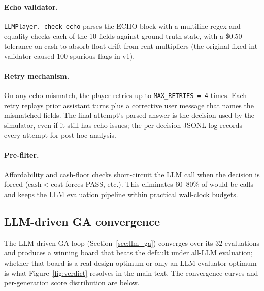 \documentclass[10pt]{article}
\begin{document}
\paragraph{Echo validator.} \texttt{LLMPlayer.\_check\_echo} parses
the ECHO block with a multiline regex and equality-checks each of
the 10 fields against ground-truth state, with a \$0.50 tolerance
on cash to absorb float drift from rent multipliers (the original
fixed-int validator caused $100$ spurious flags in v1).

\paragraph{Retry mechanism.} On any echo mismatch, the player
retries up to \texttt{MAX\_RETRIES = 4} times. Each retry replays
prior assistant turns plus a corrective user message that names
the mismatched fields. The final attempt's parsed answer is the
decision used by the simulator, even if it still has echo issues;
the per-decision JSONL log records every attempt for post-hoc
analysis.

\paragraph{Pre-filter.} Affordability and cash-floor checks
short-circuit the LLM call when the decision is forced
($\mathrm{cash} < \mathrm{cost}$ forces PASS, etc.). This
eliminates 60--80\% of would-be calls and keeps the LLM evaluation
pipeline within practical wall-clock budgets.

\subsection{LLM-driven GA convergence}\label{app:llm_ga_conv}

The LLM-driven GA loop (Section~\ref{sec:llm_ga}) converges over
its $32$ evaluations and produces a winning board that beats the
default under all-LLM evaluation; whether that board is a real
design optimum or only an LLM-evaluator optimum is what
Figure~\ref{fig:verdict} resolves in the main text. The
convergence curves and per-generation score distribution are below.
\end{document}
